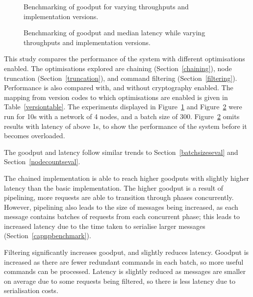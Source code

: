 \begin{figure}[h!]
\centering
\resizebox{.6\textwidth}{!}{}
\caption{Benchmarking of goodput for varying throughputs and implementation versions.}
\label{throughputgoodputablation}
\end{figure}

\begin{figure}[h!]
\centering
\resizebox{.6\textwidth}{!}{}
\caption{Benchmarking of goodput and median latency while varying throughputs and implementation versions.}
\label{goodputlatencablation}
\end{figure}

This study compares the performance of the system with different optimisations enabled. The optimisations explored are chaining (Section~\ref{chaining}), node truncation (Section~\ref{truncation}), and command filtering (Section~\ref{filtering}). Performance is also compared with, and without cryptography enabled. The mapping from version codes to which optimisations are enabled is given in Table~\ref{versiontable}. The experiments displayed in Figure~\ref{throughputgoodputablation} and Figure~\ref{goodputlatencablation} were run for 10s with a network of 4 nodes, and a batch size of 300. Figure~\ref{goodputlatencablation} omits results with latency of above 1s, to show the performance of the system before it becomes overloaded.

The goodput and latency follow similar trends to Section~\ref{batchsizeseval} and Section~\ref{nodecountseval}.

The chained implementation is able to reach higher goodputs with slightly higher latency than the basic implementation. The higher goodput is a result of pipelining, more requests are able to transition through phases concurrently. However, pipelining also leads to the size of messages being increased, as each message contains batches of requests from each concurrent phase; this leads to increased latency due to the time taken to serialise larger messages (Section~\ref{capnpbenchmark}).

Filtering significantly increases goodput, and slightly reduces latency. Goodput is increased as there are fewer redundant commands in each batch, so more useful commands can be processed. Latency is slightly reduced as messages are smaller on average due to some requests being filtered, so there is less latency due to serialisation costs.

